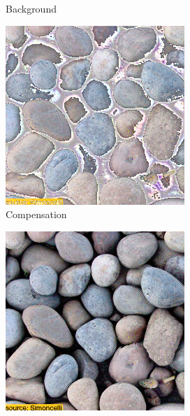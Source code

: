\begin{figure}[]
\begin{subfigure}{\textwidth}
\begin{subfigure}{0.24\textwidth}
            \caption{Background}
            \label{fig:ex01-pebbles-1000steps-threshold_bg}
        \end{subfigure}
        \hfill
        \begin{subfigure}{0.24\textwidth}
            \centering
            \includegraphics[width=\textwidth]{images/04-experiment01/pebbles/1000/threshold_im.jpg}
            \caption{Compensation}
            \label{fig:ex01-pebbles-1000steps-threshold_im}
        \end{subfigure}
        \hfill
        \begin{subfigure}{0.24\textwidth}
            \centering
            \includegraphics[width=\textwidth]{images/04-experiment01/pebbles/1000/threshold_proj.jpg}

\end{subfigure}
\end{subfigure}
\end{figure}
